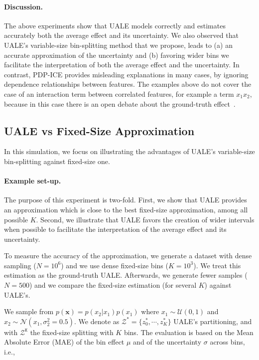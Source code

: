 \documentclass[twoside]{article}
\begin{document}
\paragraph{Discussion.}

The above experiments show that UALE models correctly and estimates accurately both the average effect and its uncertainty. We also observed that UALE's variable-size bin-splitting method that we propose, leads to (a) an accurate approximation of the uncertainty and (b) favoring wider bins we facilitate the interpretation of both the average effect and the uncertainty. In contrast, PDP-ICE provides misleading explanations in many cases, by ignoring dependence relationships between features. The examples above do not cover the case of an interaction term between correlated features, for example a term \(x_1x_2\), because in this case there is an open debate about the ground-truth effect~\citep{Gromping2020MAEP}.

\subsection{UALE vs Fixed-Size Approximation}
\label{sec:simulation-examples-2}

In this simulation, we focus on illustrating the advantages of UALE's
variable-size bin-splitting against fixed-size one.

\paragraph{Example set-up.}
The purpose of this experiment is two-fold. First, we show that UALE
provides an approximation which is close to the best fixed-size
approximation, among all possible \(K\). Second, we illustrate that
UALE favors the creation of wider intervals when possible to
facilitate the interpretation of the average effect and its
uncertainty.

To measure the accuracy of the approximation, we generate a dataset
with dense sampling (\(N=10^6\)) and we use dense fixed-size bins
(\(K=10^3\)). We treat this estimation as the ground-truth
UALE. Afterwards, we generate fewer samples (\(N=500\)) and we compare
the fixed-size estimation (for several \(K\)) against UALE's.

We sample from \(p(\mathbf{x}) = p(x_2|x_1)p(x_1)\) where
\(x_1 \sim \mathcal{U}(0,1)\) and
\(x_2 \sim \mathcal{N}(x_1, \sigma_2^2=0.5)\). We denote as
\(\mathcal{Z^*} = \{z^*_0, \cdots, z^*_K\}\) UALE's partitioning, and
with \(\mathcal{Z^{\mathtt{K}}}\) the fixed-size splitting with \(K\)
bins. The evaluation is based on the Mean Absolute Error (MAE) of the
bin effect \(\mu\) and of the uncertainty \(\sigma\) across bins,
i.e.,
\end{document}
